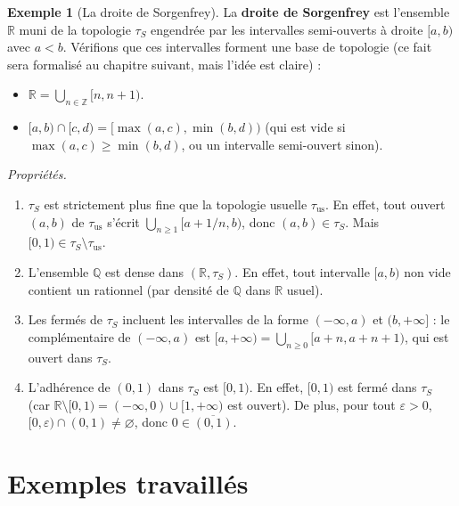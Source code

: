\documentclass[12pt,a4paper,openany]{book}
\theoremstyle{definition}
\theoremstyle{cours}
\theoremstyle{coursnormal}
\newtheorem{exemple}[theoreme]{Exemple}
\newcommand{\Z}{\mathbb{Z}}
\newcommand{\Q}{\mathbb{Q}}
\newcommand{\R}{\mathbb{R}}
\newcommand{\Cl}[1]{\overline{#1}}
\begin{document}
\begin{exemple}[La droite de Sorgenfrey]\label{ex:sorgenfrey}
  La \textbf{droite de Sorgenfrey} est l'ensemble $\R$ muni de la topologie $\tau_S$ engendrée par les intervalles semi-ouverts à droite $[a,b)$ avec $a < b$. Vérifions que ces intervalles forment une base de topologie (ce fait sera formalisé au chapitre suivant, mais l'idée est claire) :
  \begin{itemize}
    \item $\R = \bigcup_{n \in \Z} [n, n+1)$.
    \item $[a,b) \cap [c,d) = [\max(a,c), \min(b,d))$ (qui est vide si $\max(a,c) \geq \min(b,d)$, ou un intervalle semi-ouvert sinon).
  \end{itemize}

  \emph{Propriétés.}
  \begin{enumerate}[label=(\alph*)]
    \item $\tau_S$ est strictement plus fine que la topologie usuelle $\tau_{\mathrm{us}}$. En effet, tout ouvert $(a,b)$ de $\tau_{\mathrm{us}}$ s'écrit $\bigcup_{n \geq 1} [a + 1/n, b)$, donc $(a,b) \in \tau_S$. Mais $[0,1) \in \tau_S \setminus \tau_{\mathrm{us}}$.
    \item L'ensemble $\Q$ est dense dans $(\R, \tau_S)$. En effet, tout intervalle $[a,b)$ non vide contient un rationnel (par densité de $\Q$ dans $\R$ usuel).
    \item Les fermés de $\tau_S$ incluent les intervalles de la forme $(-\infty, a)$ et $(b, +\infty]$ : le complémentaire de $(-\infty, a)$ est $[a, +\infty) = \bigcup_{n \geq 0} [a+n, a+n+1)$, qui est ouvert dans $\tau_S$.
    \item L'adhérence de $(0,1)$ dans $\tau_S$ est $[0,1)$. En effet, $[0,1)$ est fermé dans $\tau_S$ (car $\R \setminus [0,1) = (-\infty, 0) \cup [1, +\infty)$ est ouvert). De plus, pour tout $\varepsilon > 0$, $[0, \varepsilon) \cap (0,1) \neq \varnothing$, donc $0 \in \Cl{(0,1)}$.
  \end{enumerate}
\end{exemple}

\section{Exemples travaillés}
\label{sec:exemples-travailles-chap2}
\end{document}
